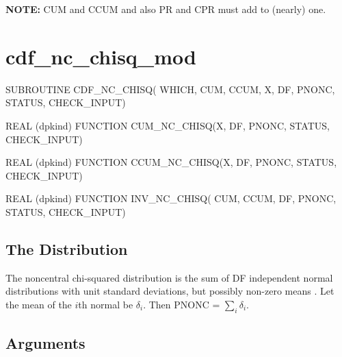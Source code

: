 \documentclass[12pt,dvips]{article}
\newcommand{\mysection}[1]{\color{blue}
             \section{#1} \normalcolor}
\newcommand{\mysubsection}[1] {\color{green}
             \subsection{#1} \normalcolor}
\begin{document}
{\bf NOTE:} CUM and CCUM and also PR and CPR must add to (nearly) one.

\pagebreak

\mysection{cdf\_nc\_chisq\_mod}

\begin{description}

\item SUBROUTINE CDF\_NC\_CHISQ( WHICH, CUM, CCUM, X, DF, PNONC,
STATUS, CHECK\_INPUT)

\item    REAL   (dpkind)   FUNCTION    CUM\_NC\_CHISQ(X,
DF, PNONC, STATUS, CHECK\_INPUT)

\item    REAL    (dpkind) FUNCTION CCUM\_NC\_CHISQ(X,
DF, PNONC, STATUS, CHECK\_INPUT)

\item  REAL (dpkind) FUNCTION  INV\_NC\_CHISQ(  CUM, CCUM,
DF, PNONC, STATUS, CHECK\_INPUT)

\end{description}

\mysubsection{The Distribution}

The noncentral  chi-squared distribution is the sum  of DF independent
normal  distributions  with  unit  standard deviations,  but  possibly
non-zero  means .  Let  the mean  of the  $i$th normal  be $\delta_i$.
Then PNONC = $ \sum_i \delta_i$.

\mysubsection{Arguments}
\end{document}
